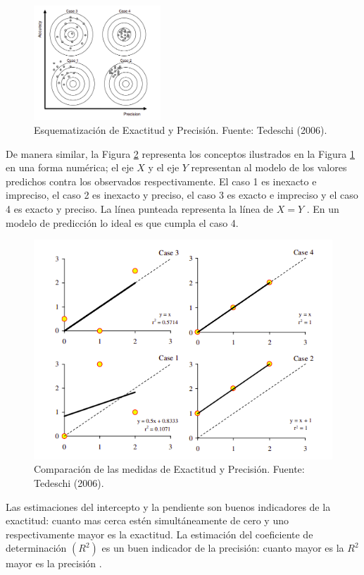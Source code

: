 \begin{figure}[H]
	\centering
	\includegraphics[width=180px]{img/tadeshi_casos.png}
	\caption{Esquematización de Exactitud y Precisión. Fuente: Tedeschi (2006).}
	\label{fig:EsquemaExacPreci}
\end{figure}
\FloatBarrier

De manera similar, la Figura \ref{fig:ComparmedidExacPreci} representa los conceptos ilustrados en la Figura \ref{fig:EsquemaExacPreci} en una forma numérica; el eje $X$ y el eje $Y$ representan al modelo de los valores predichos contra los observados respectivamente. El caso 1 es inexacto e impreciso, el caso 2 es inexacto y preciso, el caso 3 es exacto e impreciso y el caso 4 es exacto y preciso. La línea punteada representa la línea de $X = Y$ . En un modelo de predicción lo ideal es que cumpla el caso 4. 

\begin{figure}[H]
	\centering
	\includegraphics[width=0.6\linewidth]{img/tedeshi_casos_2.png}
	\caption{ Comparación de las medidas de Exactitud y Precisión. Fuente: Tedeschi (2006).}
	\label{fig:ComparmedidExacPreci}
\end{figure}
\FloatBarrier

Las estimaciones del intercepto y la pendiente son buenos indicadores de la exactitud: cuanto mas cerca
estén simultáneamente de cero y uno respectivamente mayor es la exactitud. La estimación del coeficiente de
determinación $(R^{2})$ es un buen indicador de la precisión: cuanto mayor es la $R^{2}$ mayor es la precisión \parencite{balam-2012}.
\vspace{.5cm}

